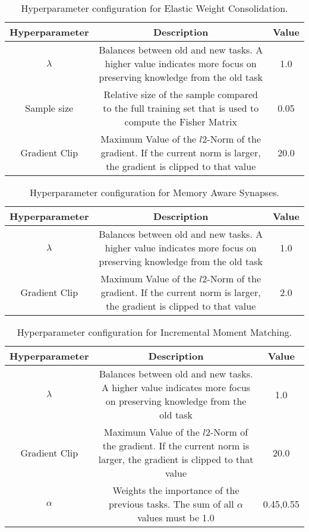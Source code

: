 \begin{table}
    \begin{tabular}{c | c c } 
        \hline
        Hyperparameter & Description & Value \\ 
        \hline 
        $\lambda$ & Balances between old and new tasks. A higher value indicates more focus
        on preserving knowledge from the old task & 1.0  \\ 
        Sample size & Relative size of the sample compared to the full training set that is used to 
        compute the Fisher Matrix & 0.05  \\ 
        Gradient Clip & Maximum Value of the $l2$-Norm of the gradient. If the current norm is larger, the
        gradient is clipped to that value & 20.0 \\ 
        \hline
    \end{tabular}
    \caption{Hyperparameter configuration for Elastic Weight Consolidation.}
    \label{fig:EWCparams}
\end{table}

\begin{table}
    \begin{tabular}{c | c c } 
        \hline
        Hyperparameter & Description & Value \\ 
        \hline 
        $\lambda$ & Balances between old and new tasks. A higher value indicates more focus
        on preserving knowledge from the old task & 1.0  \\ 
        Gradient Clip & Maximum Value of the $l2$-Norm of the gradient. If the current norm is larger, the
        gradient is clipped to that value & 2.0 \\ 
        \hline
    \end{tabular}
    \caption{Hyperparameter configuration for Memory Aware Synapses.}
    \label{fig:MASparams}
\end{table}

\begin{table}
    \begin{tabular}{c | c c } 
        \hline
        Hyperparameter & Description & Value \\ 
        \hline 
        $\lambda$ & Balances between old and new tasks. A higher value indicates more focus
        on preserving knowledge from the old task & 1.0  \\ 
        Gradient Clip & Maximum Value of the $l2$-Norm of the gradient. If the current norm is larger, the
        gradient is clipped to that value & 20.0 \\ 
        $\alpha$ & Weights the importance of the previous tasks. The sum of all $\alpha$ values must be 1.0 & 0.45,0.55 \\
        \hline
    \end{tabular}
    \caption{Hyperparameter configuration for Incremental Moment Matching.}
    \label{fig:IMMparams}
\end{table}

